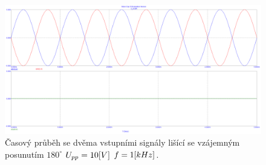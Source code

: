 \documentclass{article}
\begin{document}
\begin{figure}[H]
  \begin{minipage}[t]{\textwidth}
    \centering
    \includegraphics[width=\textwidth]{PC/ukol2/nula_vzstup.png}
    Časový průběh se dvěma vstupními signály lišící se vzájemným posunutím \(180^\circ\) \(U_{pp} = 10\-[V]\) \(f = 1\-[kHz]\).
  \end{minipage}
\end{figure}
\end{document}
